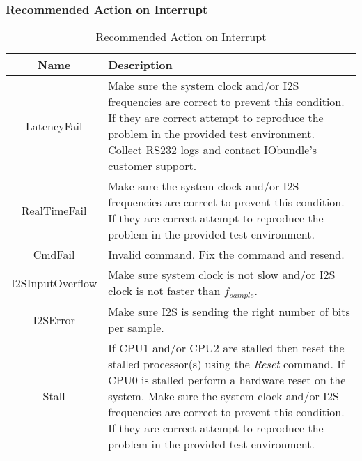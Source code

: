\documentclass{ug}
\theoremstyle{plain}
\begin{document}
\subsubsection{Recommended Action on Interrupt}
\label{sec:intrrptact}

  \begin{table}[H]
  \begin{center}
    \begin{tabular}{|c|p{9cm}|}
      \hline
      \rowcolor{iob-green}
      \textbf{Name} & \textbf{Description}  \\
      \hline
      \hline

      LatencyFail & Make sure the system clock and/or I2S frequencies are
      correct to prevent this condition. If they are correct attempt to
      reproduce the problem in the provided test environment. Collect RS232 logs
      and contact IObundle's customer support. \\ \hline

      \rowcolor{iob-blue}
      RealTimeFail & Make sure the system clock and/or I2S
      frequencies are correct to prevent this condition. If they are correct
      attempt to reproduce the problem in the provided test
      environment. \\ \hline

      CmdFail & Invalid command. Fix the command and resend.\\ \hline

      \rowcolor{iob-blue}
      I2SInputOverflow & Make sure system clock is not slow and/or I2S clock is not
      faster than $f_{sample}$.\\ \hline

      I2SError & Make sure I2S is sending the right number
      of bits per sample.\\ \hline

      \rowcolor{iob-blue}
      Stall & If CPU1 and/or CPU2 are stalled then reset the stalled
      processor(s) using the {\em Reset} command. If CPU0 is stalled perform a
      hardware reset on the system. Make sure the system clock and/or I2S
      frequencies are correct to prevent this condition. If they are correct
      attempt to reproduce the problem in the provided test
      environment.\\ \hline

    \end{tabular}
    \caption{Recommended Action on Interrupt}
    \label{tab:intrrptact}
  \end{center}
\end{table}
\end{document}
